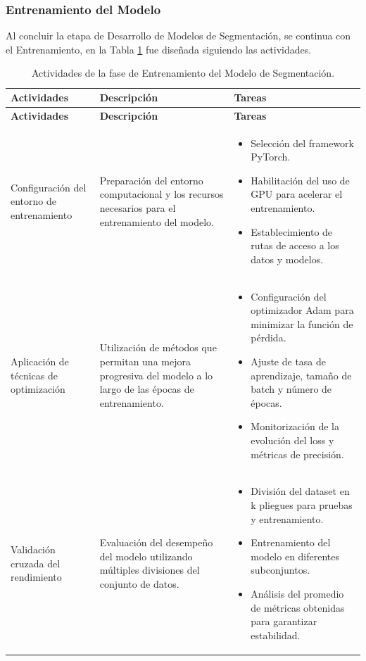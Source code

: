 \subsubsection{Entrenamiento del Modelo}

Al concluir la etapa de Desarrollo de Modelos de Segmentación, se continua con el Entrenamiento, en la Tabla \ref{tabla:entrenamiento_modelo} fue diseñada siguiendo las actividades.

\begin{longtable}{p{4cm} p{6cm} p{6cm}}
    \caption{Actividades de la fase de Entrenamiento del Modelo de Segmentación.}
    \label{tabla:entrenamiento_modelo}\\
    \toprule
    \textbf{Actividades} & \textbf{Descripción} & \textbf{Tareas} \\
    \midrule
    \endfirsthead
    
    \toprule
    \textbf{Actividades} & \textbf{Descripción} & \textbf{Tareas} \\
    \midrule
    \endhead
    
    \bottomrule
    \endfoot
    
    Configuración del entorno de entrenamiento &
    Preparación del entorno computacional y los recursos necesarios para el entrenamiento del modelo. &
    \begin{itemize}
        \item Selección del framework PyTorch.
        \item Habilitación del uso de GPU para acelerar el entrenamiento.
        \item Establecimiento de rutas de acceso a los datos y modelos.
    \end{itemize} \\
    
    Aplicación de técnicas de optimización &
    Utilización de métodos que permitan una mejora progresiva del modelo a lo largo de las épocas de entrenamiento. &
    \begin{itemize}
        \item Configuración del optimizador Adam para minimizar la función de pérdida.
        \item Ajuste de tasa de aprendizaje, tamaño de batch y número de épocas.
        \item Monitorización de la evolución del loss y métricas de precisión.
    \end{itemize} \\
    
    Validación cruzada del rendimiento &
    Evaluación del desempeño del modelo utilizando múltiples divisiones del conjunto de datos. &
    \begin{itemize}
        \item División del dataset en k pliegues para pruebas y entrenamiento.
        \item Entrenamiento del modelo en diferentes subconjuntos.
        \item Análisis del promedio de métricas obtenidas para garantizar estabilidad.
    \end{itemize} \\
    
    \end{longtable}


